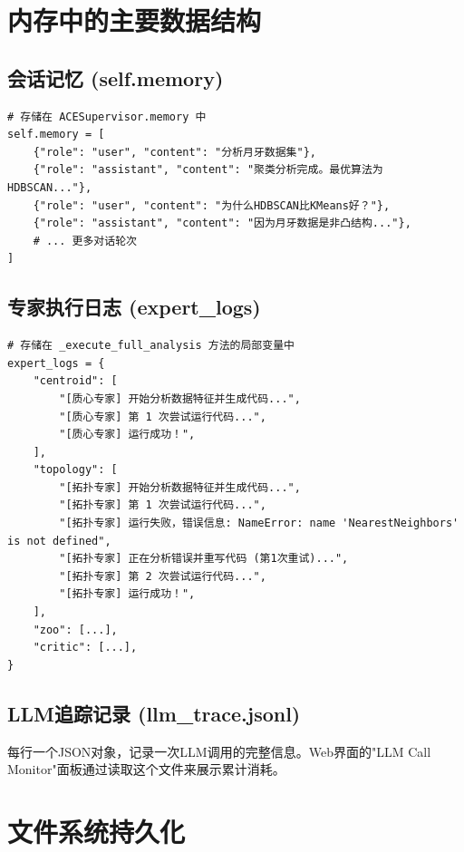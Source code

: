 \documentclass[11pt,a4paper]{ctexbook}
\begin{document}
\section{内存中的主要数据结构}

\subsection{会话记忆 (self.memory)}

\begin{verbatim}
# 存储在 ACESupervisor.memory 中
self.memory = [
    {"role": "user", "content": "分析月牙数据集"},
    {"role": "assistant", "content": "聚类分析完成。最优算法为HDBSCAN..."},
    {"role": "user", "content": "为什么HDBSCAN比KMeans好？"},
    {"role": "assistant", "content": "因为月牙数据是非凸结构..."},
    # ... 更多对话轮次
]
\end{verbatim}

\subsection{专家执行日志 (expert\_logs)}

\begin{verbatim}
# 存储在 _execute_full_analysis 方法的局部变量中
expert_logs = {
    "centroid": [
        "[质心专家] 开始分析数据特征并生成代码...",
        "[质心专家] 第 1 次尝试运行代码...",
        "[质心专家] 运行成功！",
    ],
    "topology": [
        "[拓扑专家] 开始分析数据特征并生成代码...",
        "[拓扑专家] 第 1 次尝试运行代码...",
        "[拓扑专家] 运行失败，错误信息: NameError: name 'NearestNeighbors' is not defined",
        "[拓扑专家] 正在分析错误并重写代码 (第1次重试)...",
        "[拓扑专家] 第 2 次尝试运行代码...",
        "[拓扑专家] 运行成功！",
    ],
    "zoo": [...],
    "critic": [...],
}
\end{verbatim}

\subsection{LLM追踪记录 (llm\_trace.jsonl)}

每行一个JSON对象，记录一次LLM调用的完整信息。Web界面的"LLM Call Monitor"面板通过读取这个文件来展示累计消耗。

\section{文件系统持久化}
\end{document}
